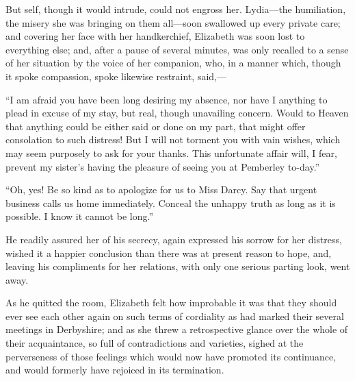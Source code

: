 \documentclass[12pt]{book}
\begin{document}
But self, though it would intrude, could not engross her. Lydia---the humiliation, the misery she was bringing on them all---soon swallowed up every private care; and covering her face with her handkerchief, Elizabeth was soon lost to everything else; and, after a pause of several minutes, was only recalled to a sense of her situation by the voice of her companion, who, in a manner which, though it spoke compassion, spoke likewise restraint, said,---

``I am afraid you have been long desiring my absence, nor have I anything to plead in excuse of my stay, but real, though unavailing concern. Would to Heaven that anything could be either said or done on my part, that might offer consolation to such distress! But I will not torment you with vain wishes, which may seem purposely to ask for your thanks. This unfortunate affair will, I fear, prevent my sister's having the pleasure of seeing you at Pemberley to-day.''

``Oh, yes! Be so kind as to apologize for us to Miss Darcy. Say that urgent business calls us home immediately. Conceal the unhappy truth as long as it is possible. I know it cannot be long.''

He readily assured her of his secrecy, again expressed his sorrow for her distress, wished it a happier conclusion than there was at present reason to hope, and, leaving his compliments for her relations, with only one serious parting look, went away.

As he quitted the room, Elizabeth felt how improbable it was that they should ever see each other again on such terms of cordiality as had marked their several meetings in Derbyshire; and as she threw a retrospective glance over the whole of their acquaintance, so full of contradictions and varieties, sighed at the perverseness of those feelings which would now have promoted its continuance, and would formerly have rejoiced in its termination.
\end{document}
